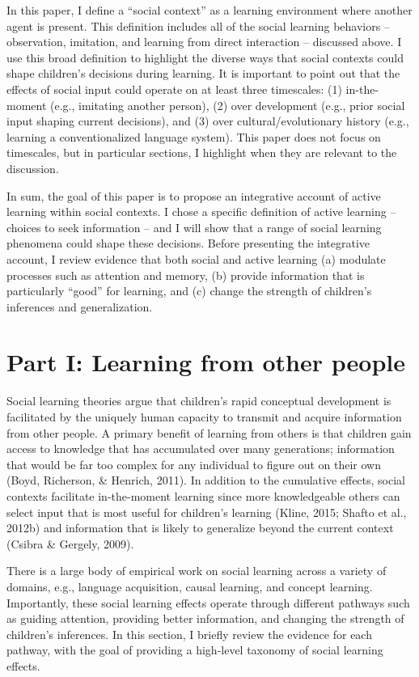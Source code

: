\documentclass[oneside]{report}
\begin{document}
In this paper, I define a ``social context'' as a learning environment
where another agent is present. This definition includes all of the
social learning behaviors -- observation, imitation, and learning from
direct interaction -- discussed above. I use this broad definition to
highlight the diverse ways that social contexts could shape children's
decisions during learning. It is important to point out that the effects
of social input could operate on at least three timescales: (1)
in-the-moment (e.g., imitating another person), (2) over development
(e.g., prior social input shaping current decisions), and (3) over
cultural/evolutionary history (e.g., learning a conventionalized
language system). This paper does not focus on timescales, but in
particular sections, I highlight when they are relevant to the
discussion.

In sum, the goal of this paper is to propose an integrative account of
active learning within social contexts. I chose a specific definition of
active learning -- choices to seek information -- and I will show that a
range of social learning phenomena could shape these decisions. Before
presenting the integrative account, I review evidence that both social
and active learning (a) modulate processes such as attention and memory,
(b) provide information that is particularly ``good'' for learning, and
(c) change the strength of children's inferences and generalization.

\hypertarget{p1}{%
\section{Part I: Learning from other people}\label{p1}}

Social learning theories argue that children's rapid conceptual
development is facilitated by the uniquely human capacity to transmit
and acquire information from other people. A primary benefit of learning
from others is that children gain access to knowledge that has
accumulated over many generations; information that would be far too
complex for any individual to figure out on their own (Boyd, Richerson,
\& Henrich, 2011). In addition to the cumulative effects, social
contexts facilitate in-the-moment learning since more knowledgeable
others can select input that is most useful for children's learning
(Kline, 2015; Shafto et al., 2012b) and information that is likely to
generalize beyond the current context (Csibra \& Gergely, 2009).

There is a large body of empirical work on social learning across a
variety of domains, e.g., language acquisition, causal learning, and
concept learning. Importantly, these social learning effects operate
through different pathways such as guiding attention, providing better
information, and changing the strength of children's inferences. In this
section, I briefly review the evidence for each pathway, with the goal
of providing a high-level taxonomy of social learning effects.
\end{document}
